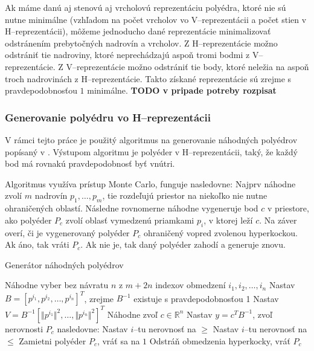Ak máme danú aj stenovú aj vrcholovú reprezentáciu polyédra, ktoré nie sú nutne minimálne (vzhľadom na počet vrcholov vo V--reprezentácii a počet stien v H--reprezentácii), môžeme jednoducho dané reprezentácie minimalizovať odstránením prebytočných nadrovín a vrcholov. Z H--reprezentácie možno odstrániť tie nadroviny, ktoré neprechádzajú aspoň tromi bodmi z V--reprezentácie. Z V--reprezentácie možno odstrániť tie body, ktoré neležia na aspoň troch nadrovinách z H--reprezentácie. Takto získané reprezentácie sú zrejme s pravdepodobnosťou $1$ minimálne. \textbf{TODO v pripade potreby rozpisat}

\subsubsection{Generovanie polyédru vo H--reprezentácii}
V rámci tejto práce je použitý algoritmus na generovanie náhodných polyédrov popísaný v \cite{may_random}. Výstupom algoritmu je polyéder v H--reprezentácii, taký, že každý bod má rovnakú pravdepodobnosť byť vnútri. 

Algoritmus využíva prístup Monte Carlo, funguje nasledovne: Najprv náhodne zvolí $m$ nadrovín $p_1, \dots, p_m$, tie rozdeľujú priestor na niekoľko nie nutne ohraničených oblastí.
Následne rovnomerne náhodne vygeneruje bod $c$ v priestore, ako polyéder $P_c$ zvolí oblasť vymedzenú priamkami $p_i$, v ktorej leží $c$.
Na záver overí, či je vygenerovaný polyéder $P_c$ ohraničený vopred zvolenou hyperkockou. Ak áno, tak vráti $P_c$. Ak nie je, tak daný polyéder zahodí a generuje znovu.

\begin{algorithm}[H]
	\caption{Generátor náhodných polyédrov \cite{may_random}}
	\label{generator-polyedrov}
	\begin{algorithmic}[1]
		\State Náhodne vyber bez návratu $n$ z $m+2n$ indexov obmedzení $i_1, i_2, \dots, i_n$
		\State Nastav $B=[p^{i_1}, p^{i_2}, \dots, p^{i_n}]^T$, zrejme $B^{-1}$ existuje s pravdepodobnosťou 1
		\State Nastav $V=B^{-1}[\Vert p^{i_1}\Vert ^2, \dots, \Vert p^{i_n}\Vert ^2]^T$
		\State Náhodne zvoľ $c \in \mathbb{R}^n$
		\State Nastav $y=c^TB^{-1}$, zvoľ nerovnosti $P_c$ nasledovne:
				\State Nastav $i$--tu nerovnosť na $\ge$
			\Else
				\State Nastav $i$--tu nerovnosť na $\le$
			\EndIf
		\EndFor
			\State Zamietni polyéder $P_c$, vráť sa na $1$
		\Else
			\State Odstráň obmedzenia hyperkocky, vráť $P_c$
		\EndIf
	\end{algorithmic}
\end{algorithm}


